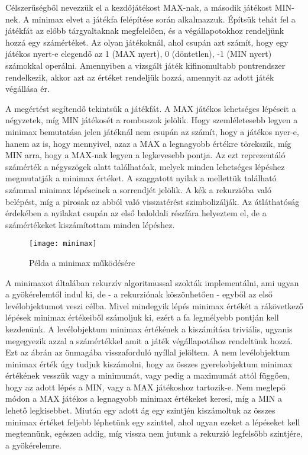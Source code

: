 Célszerűségből nevezzük el a kezdőjátékost MAX-nak, a második játékost MIN-nek. A minimax elvet a játékfa felépítése során alkalmazzuk. Építsük tehát fel a játékfát az előbb tárgyaltaknak megfelelően, és a végállapotokhoz rendeljünk hozzá egy számértéket. Az olyan játékoknál, ahol csupán azt számít, hogy egy játékos nyert-e elegendő az 1 (MAX nyert), 0 (döntetlen), -1 (MIN nyert) számokkal operálni. Amennyiben a vizsgált játék kifinomultabb pontrendszer rendelkezik, akkor azt az értéket rendeljük hozzá, amennyit az adott játék végállása ér.\ujsor

A megértést segítendő tekintsük a  játékfát. A MAX játékos lehetséges lépéseit a négyzetek, míg MIN játékosét a rombuszok jelölik. Hogy szemléletesebb legyen a minimax bemutatása jelen játéknál nem csupán az számít, hogy a játékos nyer-e, hanem az is, hogy mennyivel, azaz a MAX a legnagyobb értékre törekszik, míg MIN arra, hogy a MAX-nak legyen a legkevesebb pontja. Az ezt reprezentáló számérték a négyszögek alatt találhatóak, melyek minden lehetséges lépéshez megmutatják a minimax értéket. A szaggatott nyilak a mellettük található számmal minimax lépéseinek a sorrendjét jelölik. A kék a rekurzióba való belépést, míg a pirosak az abból való visszatérést szimbolizálják. Az átláthatóság érdekében a nyilakat csupán az első baloldali részfára helyeztem el, de a számértékeket kiszámítottam minden lépéshez. \ujsor

\begin{figure}[ht]
	\texttt{[image: minimax]}
	\centering
	\caption{Példa a minimax működésére}
	\label{fig:minimax}
\end{figure}

A minimaxot általában rekurzív algoritmussal szokták implementálni, ami ugyan a gyökérelemtől indul ki, de - a rekurziónak köszönhetően - egyből az első levélobjektumot veszi célba. Mivel mindegyik lépés minimax értékét a rákövetkező lépések minimax értékeiből számoljuk ki, ezért a fa legmélyebb pontján kell kezdenünk. A levélobjektum minimax értékének a kiszámítása triviális, ugyanis megegyezik azzal a számértékkel amit a játék végállapotához rendeltünk hozzá. Ezt az ábrán az önmagába visszaforduló nyíllal jelöltem. A nem levélobjektum minimax érték úgy tudjuk kiszámolni, hogy az összes gyerekobjektum minimax értékének vesszük vagy a minimumát, vagy pedig a maximumát attól függően, hogy az adott lépés a MIN, vagy a MAX játékoshoz tartozik-e. Nem meglepő módon a MAX játékos a legnagyobb minimax értékeket keresi, míg a MIN a lehető legkisebbet. Miután egy adott ág egy szintjén kiszámoltuk az összes minimax értéket feljebb léphetünk egy szinttel, ahol ugyan ezeket a lépéseket kell megtennünk, egészen addig, míg vissza nem jutunk a rekurzió legfelsőbb szintjére, a gyökérelemre.\ujsor

